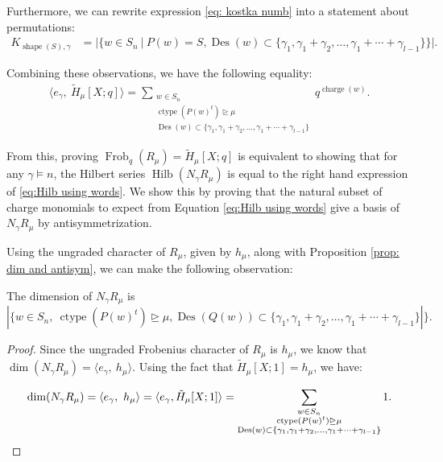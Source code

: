 \documentclass[ALCO, Unicode]{cedram}
\DeclareMathOperator{\charge}{charge}
\DeclareMathOperator{\ctype}{ctype}
\DeclareMathOperator{\Frob}{Frob}
\DeclareMathOperator{\Hilb}{Hilb}
\DeclareMathOperator{\shape}{shape}
\DeclareMathOperator{\des}{Des}
\newcommand{\mHL}{\tilde{H}}
\begin{document}
Furthermore, we can rewrite expression \eqref{eq: kostka numb} into a statement about permutations:
\begin{align*}
    K_{\shape(S),\gamma} &=  | \{w \in S_n  \ | \ P(w) = S, \des(w) \subset \{\gamma_1,\gamma_1 + \gamma_2, \dots, \gamma_1 +\cdots + \gamma_{l-1}\} \} |.
\end{align*}



Combining these observations, we have the following equality:
\begin{align}\label{eq:Hilb using words}
    \langle e_{\gamma},\  \mHL_{\mu} [X;q]\rangle  = \sum\limits_{\substack{w\in S_n\\  \ctype(P(w)^t)\unrhd\mu \\ \des(w) \subset \{\gamma_1,\gamma_1 + \gamma_2, \dots, \gamma_1 +\cdots + \gamma_{l-1}\} }}  q^{\charge(w)}.
\end{align}

From this, proving $\Frob_q(R_{\mu}) = \mHL_{\mu}[X;q]$ is equivalent to showing that for any $\gamma\models n$, the Hilbert series $\Hilb(N_\gamma R_{\mu})$ is equal to the right hand expression of \eqref{eq:Hilb using words}.
We show this by proving that the natural subset of charge monomials to expect from Equation \eqref{eq:Hilb using words} give a basis of $N_\gamma R_{\mu}$ by antisymmetrization.


Using the ungraded character of $R_\mu$, given by $h_\mu$, along with Proposition \ref{prop: dim and antisym}, we can make the following observation:
\begin{lemma}\label{lem:antisymm dimension}
    The dimension of $N_\gamma R_{\mu}$ is 
    \[|\{ w \in S_n, \ \ctype(P(w)^t) \unrhd\mu, \des(Q(w)) \subset \{\gamma_1,\gamma_1 + \gamma_2, \dots, \gamma_1 + \cdots + \gamma_{l-1}\}|\}.\]
\end{lemma}
\begin{proof}
    Since the ungraded Frobenius character of $R_{\mu}$ is $h_{\mu}$, we know that $\dim(N_\gamma R_{\mu}) = \langle e_{\gamma},\ h_{\mu} \rangle$.
    Using the fact that $\mHL_{\mu}[X;1] = h_{\mu}$, we have:
    
    \[\dim(N_\gamma R_{\mu}) = \langle e_{\gamma},\ h_{\mu} \rangle =   \langle e_{\gamma},\mHL_{\mu}[X;1] \rangle = \sum\limits_{\substack{w\in S_n\\  \ctype(P(w)^t)\unrhd\mu \\ \des(w) \subset \{\gamma_1,\gamma_1 + \gamma_2, \dots, \gamma_1 +\cdots + \gamma_{l-1}\} }}  1. \qedhere\]
\end{proof}
\end{document}
